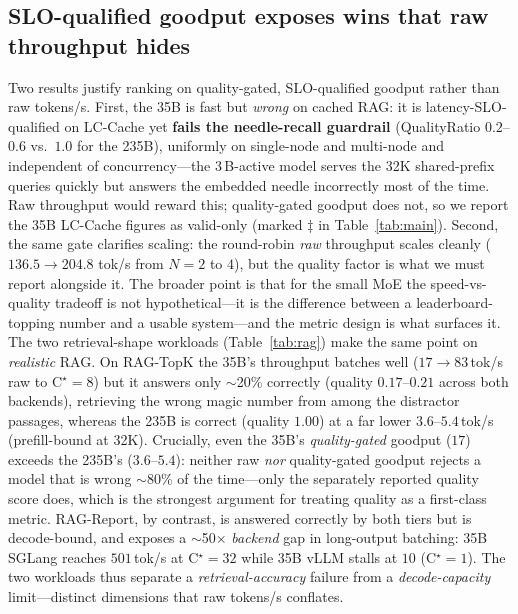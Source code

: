 \subsection{SLO-qualified goodput exposes wins that raw throughput hides}
\label{subsec:insight-goodput}
Two results justify ranking on quality-gated, SLO-qualified goodput rather than raw
tokens/s. First, the 35B is fast but \emph{wrong} on cached RAG: it is
latency-SLO-qualified on LC-Cache yet \textbf{fails the needle-recall guardrail}
(QualityRatio $0.2$--$0.6$ vs.\ $1.0$ for the 235B), uniformly on single-node and
multi-node and independent of concurrency---the 3\,B-active model serves the 32K
shared-prefix queries quickly but answers the embedded needle incorrectly most of
the time. Raw throughput would reward this; quality-gated goodput does not, so we
report the 35B LC-Cache figures as valid-only (marked $\ddagger$ in
Table~\ref{tab:main}). Second, the same gate clarifies scaling: the round-robin
\emph{raw} throughput scales cleanly ($136.5\!\to\!204.8$ tok/s from $N{=}2$ to
$4$), but the quality factor is what we must report alongside it. The broader point
is that for the small MoE the speed-vs-quality tradeoff is not hypothetical---it is
the difference between a leaderboard-topping number and a usable system---and the
metric design is what surfaces it. The two retrieval-shape workloads
(Table~\ref{tab:rag}) make the same point on \emph{realistic} RAG. On RAG-TopK the
35B's throughput batches well ($17\!\to\!83$\,tok/s raw to C$^\star{=}8$) but it
answers only $\sim$20\% correctly (quality $0.17$--$0.21$ across both backends),
retrieving the wrong magic number from among the distractor passages, whereas the
235B is correct (quality $1.00$) at a far lower $3.6$--$5.4$\,tok/s (prefill-bound at
32K). Crucially, even the 35B's \emph{quality-gated} goodput ($17$) exceeds the
235B's ($3.6$--$5.4$): neither raw \emph{nor} quality-gated goodput rejects a model
that is wrong $\sim$80\% of the time---only the separately reported quality score
does, which is the strongest argument for treating quality as a first-class metric.
RAG-Report, by contrast, is answered correctly by both tiers but is decode-bound,
and exposes a $\sim$50$\times$ \emph{backend} gap in long-output batching: 35B SGLang
reaches $501$\,tok/s at C$^\star{=}32$ while 35B vLLM stalls at $10$ (C$^\star{=}1$).
The two workloads thus separate a \emph{retrieval-accuracy} failure from a
\emph{decode-capacity} limit---distinct dimensions that raw tokens/s conflates.

